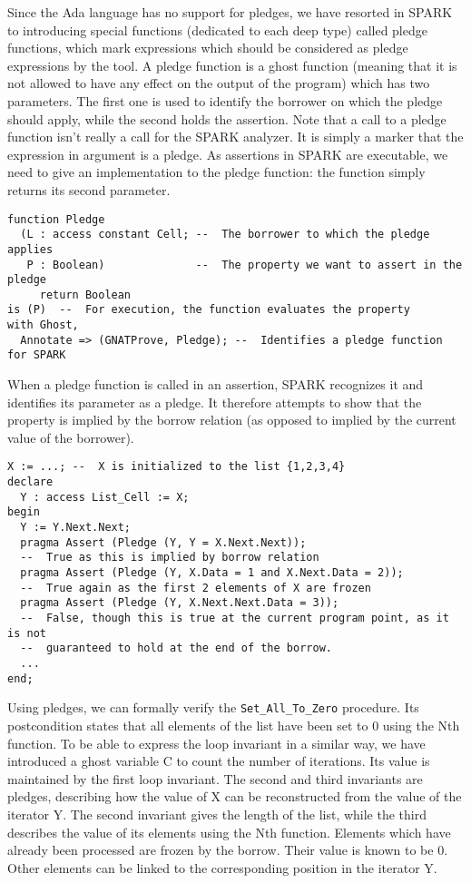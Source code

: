 \documentclass[runningheads]{llncs}
\begin{document}
Since the Ada language has no support for pledges, we have resorted in SPARK to introducing special functions (dedicated to each deep type) called pledge functions, which mark expressions which should be considered as pledge expressions by the tool. A pledge function is a ghost function (meaning that it is not allowed to have any effect on the output of the program) which has two parameters. The first one is used to identify the borrower on which the pledge should apply, while the second holds the assertion.
Note that a call to a pledge function isn't really a call for the SPARK analyzer. It is simply a marker that the expression in argument is a pledge. As assertions in SPARK are executable, we need to give an implementation to the pledge function: the function simply returns its second parameter.
\begin{lstlisting}
function Pledge
  (L : access constant Cell; --  The borrower to which the pledge applies
   P : Boolean)              --  The property we want to assert in the pledge
     return Boolean
is (P)  --  For execution, the function evaluates the property
with Ghost,
  Annotate => (GNATProve, Pledge); --  Identifies a pledge function for SPARK
\end{lstlisting}
When a pledge function is called in an assertion, SPARK recognizes it and identifies its parameter as a pledge. It therefore attempts to show that the property is implied by the borrow relation (as opposed to implied by the current value of the borrower).
\begin{lstlisting}
X := ...; --  X is initialized to the list {1,2,3,4}
declare
  Y : access List_Cell := X;
begin
  Y := Y.Next.Next;
  pragma Assert (Pledge (Y, Y = X.Next.Next));
  --  True as this is implied by borrow relation
  pragma Assert (Pledge (Y, X.Data = 1 and X.Next.Data = 2));
  --  True again as the first 2 elements of X are frozen
  pragma Assert (Pledge (Y, X.Next.Next.Data = 3));
  --  False, though this is true at the current program point, as it is not
  --  guaranteed to hold at the end of the borrow.
  ...
end;
\end{lstlisting}
Using pledges, we can formally verify the \texttt{Set\_All\_To\_Zero} procedure. Its postcondition states that all elements of the list have been set to 0 using the Nth function. To be able to express the loop invariant in a similar way, we have introduced a ghost variable C to count the number of iterations. Its value is maintained by the first loop invariant. The second and third invariants are pledges, describing how the value of X can be reconstructed from the value of the iterator Y. The second invariant gives the length of the list, while the third describes the value of its elements using the Nth function. Elements which have already been processed are frozen by the borrow. Their value is known to be 0. Other elements can be linked to the corresponding position in the iterator Y. 
\end{document}
